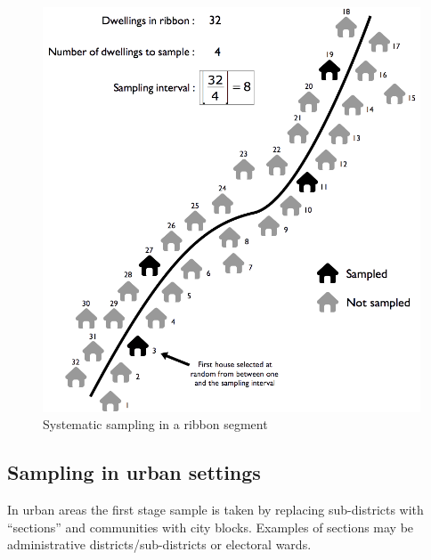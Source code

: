 \documentclass[12pt,a4paper]{book}
\theoremstyle{definition}
\theoremstyle{definition}
\theoremstyle{definition}
\theoremstyle{remark}
\begin{document}
\begin{figure}[H]

{\centering \includegraphics[width=800pt]{figures/stage2sample9} 

}

\caption{Systematic sampling in a ribbon segment}\label{fig:sample23}
\end{figure}

\hypertarget{sampling-in-urban-settings}{%
\subsection{Sampling in urban
settings}\label{sampling-in-urban-settings}}

In urban areas the first stage sample is taken by replacing
sub-districts with ``sections'' and communities with city blocks.
Examples of sections may be administrative districts/sub-districts or
electoral wards.
\end{document}

